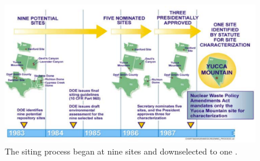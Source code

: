 \begin{figure}[htbp!]
  \begin{center}
    \includegraphics[height=0.7\textheight]{nine_sites_to_one.eps}
  \end{center}
  \caption{The siting process began at nine sites and downselected to one 
    \cite{peters_whats_2013}.}
  \label{fig:nine_sites_to_one}
\end{figure}
